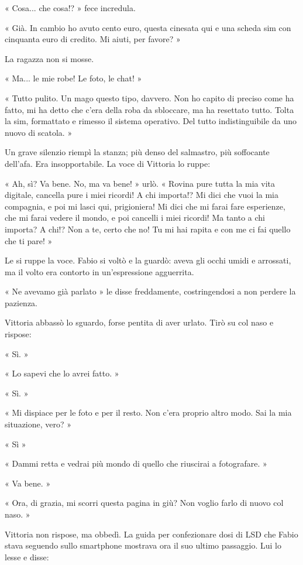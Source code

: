 « Cosa... che cosa!? » fece incredula.

« Già. In cambio ho avuto cento euro, questa cinesata qui e una scheda sim con cinquanta euro di credito. Mi aiuti, per favore? »

La ragazza non si mosse.

« Ma... le mie robe! Le foto, le chat! »

« Tutto pulito. Un mago questo tipo, davvero. Non ho capito di preciso come ha fatto, mi ha detto che c'era della roba da sbloccare, ma ha resettato tutto. Tolta la sim, formattato e rimesso il sistema operativo. Del tutto indistinguibile da uno nuovo di scatola. »

Un grave silenzio riempì la stanza; più denso del salmastro, più soffocante dell'afa. Era insopportabile. La voce di Vittoria lo ruppe:

« Ah, sì? Va bene. No, ma va bene! » urlò. « Rovina pure tutta la mia vita digitale, cancella pure i miei ricordi! A chi importa!? Mi dici che vuoi la mia compagnia, e poi mi lasci qui, prigioniera! Mi dici che mi farai fare esperienze, che mi farai vedere il mondo, e poi cancelli i miei ricordi! Ma tanto a chi importa? A chi!? Non a te, certo che no! Tu mi hai rapita e con me ci fai quello che ti pare! »

Le si ruppe la voce. Fabio si voltò e la guardò: aveva gli occhi umidi e arrossati, ma il volto era contorto in un'espressione agguerrita.

« Ne avevamo già parlato » le disse freddamente, costringendosi a non perdere la pazienza.

Vittoria abbassò lo sguardo, forse pentita di aver urlato. Tirò su col naso e rispose:

« Sì. »

« Lo sapevi che lo avrei fatto. »

« Sì. »

« Mi dispiace per le foto e per il resto. Non c'era proprio altro modo. Sai la mia situazione, vero? »

« Sì »

« Dammi retta e vedrai più mondo di quello che riuscirai a fotografare. »

« Va bene. »

« Ora, di grazia, mi scorri questa pagina in giù? Non voglio farlo di nuovo col naso. »

Vittoria non rispose, ma obbedì. La guida per confezionare dosi di LSD che Fabio stava seguendo sullo smartphone mostrava ora il suo ultimo passaggio. Lui lo lesse e disse:

